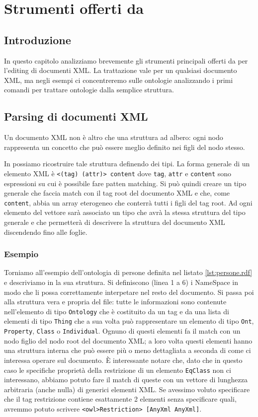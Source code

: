 \chapter{Strumenti offerti da \cduce}\label{ch2}
\section{Introduzione}
In questo capitolo analizziamo brevemente gli strumenti principali offerti da \cduce per l'editing di documenti XML. La trattazione vale per un qualsiasi documento XML, ma negli esempi ci concentreremo sulle ontologie analizzando i primi comandi per trattare ontologie dalla semplice struttura. 


\section{Parsing di documenti XML}
Un documento XML non è altro che una struttura ad albero: ogni nodo rappresenta un concetto che può essere meglio definito nei figli del nodo stesso. 

In \cduce possiamo ricostruire tale struttura definendo dei tipi. La forma generale di un elemento XML è \verb|<(tag) (attr)> content| dove \verb|tag|, \verb|attr| e \verb|content| sono espressioni su cui è possibile fare patten matching. Si può quindi creare un tipo generale che faccia match con il tag root del documento XML e che, come \verb|content|, abbia un array eterogeneo che conterrà tutti i figli del tag root. Ad ogni elemento del vettore sarà associato un tipo che avrà la stessa struttura del tipo generale e che permetterà di descrivere la struttura del documento XML discendendo fino alle foglie.
\subsection{Esempio}
Torniamo all'esempio dell'ontologia di persone definita nel listato \ref{lst:persone.rdf} e descriviamo in \cduce la sua struttura.
Si definiscono (linea 1 a 6) i NameSpace in modo che \cduce li possa correttamente interpetare nel resto del documento. Si passa poi alla struttura vera e propria del file: tutte le informazioni sono contenute nell'elemento di tipo \verb|Ontology| che è costituito da un tag e da una lista di elementi di tipo \verb|Thing| che a sua volta può rappresentare un elemento di tipo \verb|Ont|, \verb|Property|, \verb|Class| o \verb|Individual|. Ognuno di questi elementi fa il match con un nodo figlio del nodo root del documento XML; a loro volta questi elementi hanno una struttura interna che può essere più o meno dettagliata a seconda di come ci interessa operare sul documento. È interessante notare che, dato che in questo caso le specifiche proprietà della restrizione di un elemento \verb|EqClass| non ci interessano, abbiamo potuto fare il match di queste con un vettore di lunghezza arbitraria (anche nulla) di generici elementi XML. Se avessimo voluto specificare che il tag restrizione contiene esattamente 2 elementi senza specificare quali, avremmo potuto scrivere \verb|<owl>Restriction> [AnyXml AnyXml]|.

